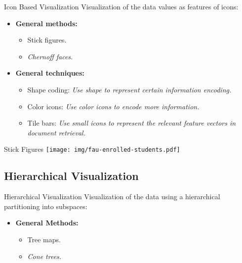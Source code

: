 \begin{frame}{Icon Based Visualization}
	Visualization of the data values as features of icons:

	\vspace*{0.2cm}

	\begin{itemize}
		\item \textbf{General methods:}
		      \begin{itemize}
			      \item Stick figures.
			      \item \textit{Chernoff faces.}
		      \end{itemize}
		\item \textbf{General techniques:}
		      \begin{itemize}
			      \item Shape coding: \emph{Use shape to represent certain information encoding.}
			      \item Color icons: \emph{Use color icons to encode more information.}
			      \item Tile bars: \emph{Use small icons to represent the relevant feature vectors in document retrieval.}
		      \end{itemize}
	\end{itemize}
\end{frame}


\begin{frame}{Stick Figures}
	\centering
	\texttt{[image: img/fau-enrolled-students.pdf]}
\end{frame}


\subsection{Hierarchical Visualization}

\begin{frame}{Hierarchical Visualization }
	Visualization of the data using a hierarchical partitioning into subspaces:

	\vspace*{0.2cm}

	\begin{itemize}
		\item \textbf{General Methods:}
		      \begin{itemize}
			      \item Tree maps.
			      \item \textit{Cone trees.}
		      \end{itemize}
	\end{itemize}
\end{frame}


